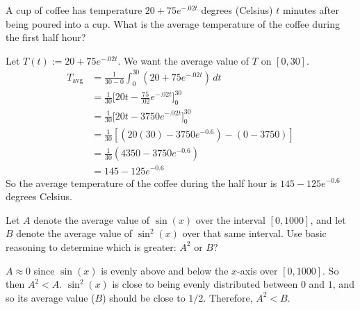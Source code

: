\documentclass[handout, nooutcomes]{ximera}
\renewenvironment{freeResponse}{
\ifhandout\setbox0\vbox\bgroup\else
\begin{trivlist}\item[\hskip \labelsep\bfseries Solution:\hspace{2ex}]
\fi}
{\ifhandout\egroup\else
\end{trivlist}
\fi}
\renewcommand{\d}{\,d}
\newcommand{\eval}[1]{\bigg[ #1 \bigg]}
\begin{document}
\begin{problem}
  \mbox{}
  \begin{enumerate}
    \item
      A cup of coffee has temperature $20 + 75e^{-.02t}$ degrees (Celsius) $t$ minutes after being poured into a cup.  
      What is the average temperature of the coffee during the first half hour?
      \begin{freeResponse}
        Let $T(t) := 20 + 75e^{-.02t}$.  We want the average value of $T$ on $[0,30]$.
        \begin{align*}
          T_{\text{avg}} &= \frac{1}{30-0} \int_0^{30} \left( 20 + 75e^{-.02t} \right) \d t  \\
                         &= \frac{1}{30} \eval{20t - \frac{75}{.02} e^{-.02t}}_0^{30}  \\
                         &= \frac{1}{30} \eval{20t - 3750 e^{-.02t}}_0^{30}  \\
                         &= \frac{1}{30} \left[ \left( 20(30) - 3750e^{-0.6} \right) - (0 - 3750) \right]  \\
                         &= \frac{1}{30} \left( 4350 - 3750e^{-0.6} \right)  \\
                         &= 145 - 125e^{-0.6} 
        \end{align*}
        So the average temperature of the coffee during the half hour is $145 - 125e^{-0.6}$ degrees Celsius.
      \end{freeResponse}
    

    \item
      Let $A$ denote the average value of $\sin(x)$ over the interval $[0,1000]$,  and let $B$ denote the average value of $\sin^2(x)$ over that same interval.
      Use basic reasoning to determine which is greater:  $A^2$ or $B$?  
      \begin{freeResponse}
        $A \approx 0$ since $\sin(x)$ is evenly above and below the $x$-axis over $[0,1000]$.  
        So then $A^2 < A$.  
        $\sin^2(x)$ is close to being evenly distributed between $0$ and $1$, and so its average value ($B$) should be close to $1/2$.  
        Therefore, $A^2 < B$.
    \end{freeResponse}
  \end{enumerate}
\end{problem}
\end{document}
